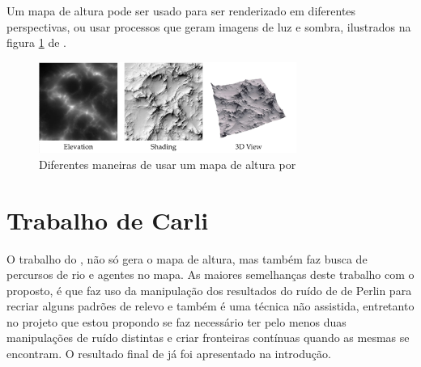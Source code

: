 Um mapa de altura pode ser usado para ser renderizado em diferentes perspectivas,
ou usar processos que geram imagens de luz e sombra, ilustrados na figura \ref{fig:hmap} de \cite{dachsbacher2006interactive}.
\begin{figure}[H]
    \centering
    \includegraphics[width=0.75\textwidth]{figuras/hmap.png}
    \caption{Diferentes maneiras de usar um mapa de altura por \cite{dachsbacher2006interactive}}
    \label{fig:hmap}
\end{figure}


\section{Trabalho de Carli}
O trabalho do \cite{carli2012canion}, não só gera o mapa de altura, mas também
faz busca de percursos de rio e agentes no mapa. As maiores semelhanças deste 
trabalho com o proposto, é que faz uso da manipulação dos resultados do ruído de
de Perlin para recriar alguns padrões de relevo e também é uma técnica não assistida,
entretanto no projeto que 
estou propondo se faz necessário ter pelo menos duas manipulações de ruído distintas
e criar fronteiras contínuas quando as mesmas se encontram. O resultado final de
\cite{carli2012canion} já foi apresentado na introdução.
